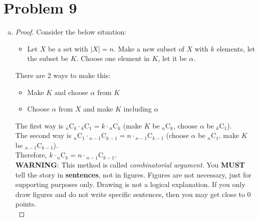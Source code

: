 \section*{Problem 9}
	\begin{enumerate} [(a)]
		\item \begin{proof}
			Consider the below situation:
			\begin{itemize}
				\item [] Let $X$ be a set with $|X| = n$. Make a new subset of $X$ with $k$ elements, let the subset be $K$. Choose one element in $K$, let it be $\alpha$.
			\end{itemize}
			\begin{center}
			\end{center}
			There are 2 ways to make this:
			\begin{itemize}
				\item Make $K$ and choose $\alpha$ from $K$
				\item Choose $\alpha$ from $X$ and make $K$ including $\alpha$
			\end{itemize}
			The first way is $_{n}\mathrm{C}_{k}\cdot{_{k}\mathrm{C}_{1}} = k\cdot{_{n}\mathrm{C}_{k}}$ (make $K$ be $_{n}\mathrm{C}_{k}$, choose $\alpha$ be $_{k}\mathrm{C}_{1}$).\\
			The second way is $_{n}\mathrm{C}_{1}\cdot{_{n - 1}\mathrm{C}_{k - 1}} = n\cdot{_{n - 1}\mathrm{C}_{k - 1}}$ (choose $\alpha$ be $_{n}\mathrm{C}_{1}$, make $K$ be $_{n - 1}\mathrm{C}_{k - 1}$).\\
			Therefore, $k\cdot{_{n}\mathrm{C}_{k}} = n\cdot{_{n - 1}\mathrm{C}_{k - 1}}$.\\
			{\color{orange} \textbf{WARNING}}: This method is called \textit{combinatorial argument}. You {\color{red} \textbf{MUST}} tell the story in {\color{teal} \textbf{sentences}}, not in figures. Figures are not necessary, just for supporting purposes only. Drawing is not a logical explanation. If you only draw figures and do not write specific sentences, then you may get close to 0 points.\\

\end{proof}
\end{enumerate}
